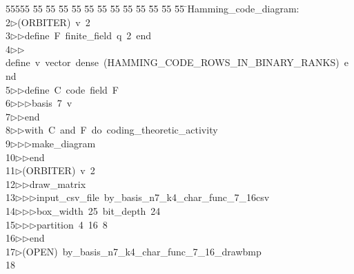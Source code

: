 %
%
\begin{tabbing}
55555 \= 55 \= 55 \= 55 \= 55 \= 55 \= 55 \= 55 \= 55 \= 55 \= 55 \= 55 \= 55 \= \>Hamming\_code\_diagram:\\[0pt]
2\>$\triangleright$\>(ORBITER)\ v\ 2\ \\[0pt]
3\>$\triangleright$\>$\triangleright$\>define\ F\ finite\_field\ q\ 2\ end\ \\[0pt]
4\>$\triangleright$\>$\triangleright$\>define\ v\ vector\ dense\ (HAMMING\_CODE\_ROWS\_IN\_BINARY\_RANKS)\ end\ \\[0pt]
5\>$\triangleright$\>$\triangleright$\>define\ C\ code\ field\ F\ \\[0pt]
6\>$\triangleright$\>$\triangleright$\>$\triangleright$\>basis\ 7\ v\ \\[0pt]
7\>$\triangleright$\>$\triangleright$\>end\ \\[0pt]
8\>$\triangleright$\>$\triangleright$\>with\ C\ and\ F\ do\ coding\_theoretic\_activity\ \\[0pt]
9\>$\triangleright$\>$\triangleright$\>$\triangleright$\>make\_diagram\ \\[0pt]
10\>$\triangleright$\>$\triangleright$\>end\\[0pt]
11\>$\triangleright$\>(ORBITER)\ v\ 2\ \\[0pt]
12\>$\triangleright$\>$\triangleright$\>draw\_matrix\ \\[0pt]
13\>$\triangleright$\>$\triangleright$\>$\triangleright$\>input\_csv\_file\ by\_basis\_n7\_k4\_char\_func\_7\_16csv\ \\[0pt]
14\>$\triangleright$\>$\triangleright$\>$\triangleright$\>box\_width\ 25\ bit\_depth\ 24\ \\[0pt]
15\>$\triangleright$\>$\triangleright$\>$\triangleright$\>partition\ 4\ 16\ 8\ \\[0pt]
16\>$\triangleright$\>$\triangleright$\>end\\[0pt]
17\>$\triangleright$\>(OPEN)\ by\_basis\_n7\_k4\_char\_func\_7\_16\_drawbmp\\[0pt]
18\>\end{tabbing}
